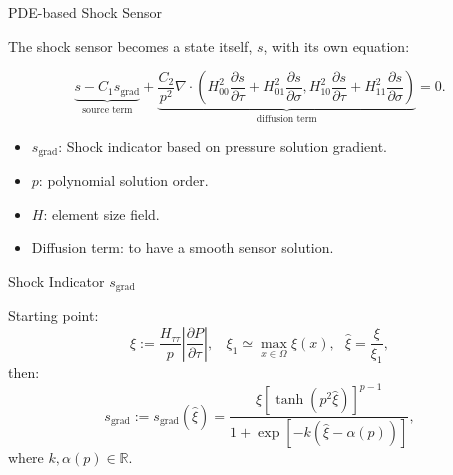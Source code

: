 \documentclass{beamer}
\newcounter{sectionframecount}
\begin{document}
\begin{frame}[t]{PDE-based Shock Sensor\footnotemark}

The shock sensor becomes a state itself, $s$, with its own equation:

\begin{equation}
  \underbrace{s - C_1s_{\text{grad}}}_{\text{source term}} + \underbrace{\dfrac{C_2}{p^2}\nabla \cdot \left(H^2_{00}\dfrac{\partial s}{\partial \tau} + H^2_{01}\dfrac{\partial s}{\partial \sigma},H^2_{10}\dfrac{\partial s}{\partial \tau}+H^2_{11}\dfrac{\partial s}{\partial \sigma}\right)}_{\text{diffusion term}} = 0.
	\label{e:sensor_source}
\end{equation}

\begin{itemize}
  \item $s_{\text{grad}}$: Shock indicator based on pressure solution gradient.
  \item $p$: polynomial solution order.
  \item $H$: element size field.
  \item Diffusion term: to have a smooth sensor solution.
\end{itemize}

\end{frame}



\begin{frame}[t]{Shock Indicator $s_{\text{grad}}$}

  Starting point:
  \begin{equation}
    \xi := \dfrac{H_{\tau\tau}}{p} \left|\dfrac{\partial P}{\partial \tau}\right|,~~~~ \xi_1 \simeq \max_{x\in\Omega} \xi(x),~~~\hat{\xi} = \dfrac{\xi}{\xi_1},
  \end{equation}
  then:
  \begin{equation}
    s_\text{grad} := s_\text{grad}(\hat{\xi}) = \dfrac{\hat{\xi} [\tanh(p^2\hat{\xi})]^{p-1}}{1+\exp\left[-k \left(\hat{\xi} - \alpha(p)\right)\right]},
    \label{e:s_grad}
  \end{equation}
  where $k,\alpha(p) \in \mathbb{R}$.
\end{frame}

\end{document}
